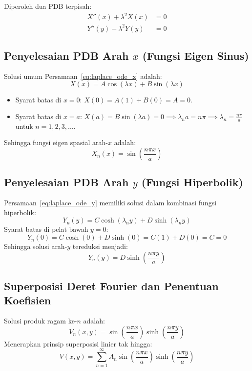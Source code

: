 \documentclass[11pt,a4paper]{article}
\theoremstyle{definition}
\begin{document}
Diperoleh dua PDB terpisah:
\begin{align}
    X''(x) + \lambda^2 X(x) &= 0 \label{eq:laplace_ode_x} \\
    Y''(y) - \lambda^2 Y(y) &= 0 \label{eq:laplace_ode_y}
\end{align}

\subsection{Penyelesaian PDB Arah \texorpdfstring{$x$}{x} (Fungsi Eigen Sinus)}
Solusi umum Persamaan~\eqref{eq:laplace_ode_x} adalah:
\begin{equation*}
    X(x) = A \cos(\lambda x) + B \sin(\lambda x)
\end{equation*}
\begin{itemize}[leftmargin=*]
    \item Syarat batas di $x = 0$: $X(0) = A(1) + B(0) = A = 0$.
    \item Syarat batas di $x = a$: $X(a) = B \sin(\lambda a) = 0 \implies \lambda_n a = n\pi \implies \lambda_n = \frac{n\pi}{a}$ untuk $n = 1, 2, 3, \dots$.
\end{itemize}
Sehingga fungsi eigen spasial arah-$x$ adalah:
\begin{equation}
    X_n(x) = \sin\left(\frac{n\pi x}{a}\right)
\end{equation}

\subsection{Penyelesaian PDB Arah \texorpdfstring{$y$}{y} (Fungsi Hiperbolik)}
Persamaan~\eqref{eq:laplace_ode_y} memiliki solusi dalam kombinasi fungsi hiperbolik:
\begin{equation*}
    Y_n(y) = C \cosh(\lambda_n y) + D \sinh(\lambda_n y)
\end{equation*}
Syarat batas di pelat bawah $y = 0$:
\begin{equation*}
    Y_n(0) = C \cosh(0) + D \sinh(0) = C(1) + D(0) = C = 0
\end{equation*}
Sehingga solusi arah-$y$ tereduksi menjadi:
\begin{equation}
    Y_n(y) = D \sinh\left(\frac{n\pi y}{a}\right)
\end{equation}

\subsection{Superposisi Deret Fourier dan Penentuan Koefisien}
Solusi produk ragam ke-$n$ adalah:
\begin{equation}
    V_n(x, y) = \sin\left(\frac{n\pi x}{a}\right) \sinh\left(\frac{n\pi y}{a}\right)
\end{equation}
Menerapkan prinsip superposisi linier tak hingga:
\begin{equation}
    V(x, y) = \sum_{n=1}^{\infty} A_n \sin\left(\frac{n\pi x}{a}\right) \sinh\left(\frac{n\pi y}{a}\right)
    \label{eq:laplace_superposition_sol}
\end{equation}
\end{document}
